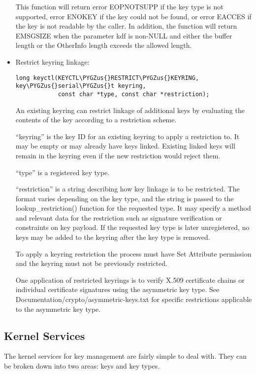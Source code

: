 \documentclass[a4paper,8pt,english]{sphinxmanual}
\def\PYGZus{\char`\_}
\begin{document}
\begin{itemize}
\begin{itemize}
\end{itemize}

This function will return error EOPNOTSUPP if the key type is not
supported, error ENOKEY if the key could not be found, or error
EACCES if the key is not readable by the caller. In addition, the
function will return EMSGSIZE when the parameter kdf is non-NULL
and either the buffer length or the OtherInfo length exceeds the
allowed length.

\item {} 
Restrict keyring linkage:

\begin{Verbatim}[commandchars=\\\{\}]
long keyctl(KEYCTL\PYGZus{}RESTRICT\PYGZus{}KEYRING, key\PYGZus{}serial\PYGZus{}t keyring,
            const char *type, const char *restriction);
\end{Verbatim}

An existing keyring can restrict linkage of additional keys by evaluating
the contents of the key according to a restriction scheme.

``keyring'' is the key ID for an existing keyring to apply a restriction
to. It may be empty or may already have keys linked. Existing linked keys
will remain in the keyring even if the new restriction would reject them.

``type'' is a registered key type.

``restriction'' is a string describing how key linkage is to be restricted.
The format varies depending on the key type, and the string is passed to
the lookup\_restriction() function for the requested type.  It may specify
a method and relevant data for the restriction such as signature
verification or constraints on key payload. If the requested key type is
later unregistered, no keys may be added to the keyring after the key type
is removed.

To apply a keyring restriction the process must have Set Attribute
permission and the keyring must not be previously restricted.

One application of restricted keyrings is to verify X.509 certificate
chains or individual certificate signatures using the asymmetric key type.
See Documentation/crypto/asymmetric-keys.txt for specific restrictions
applicable to the asymmetric key type.

\end{itemize}


\subsection{Kernel Services}
\label{security/keys/core:kernel-services}
The kernel services for key management are fairly simple to deal with. They can
be broken down into two areas: keys and key types.
\end{document}
